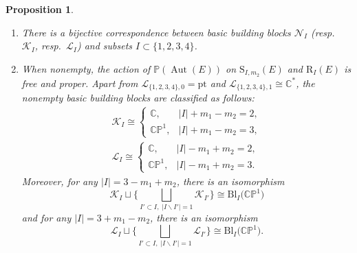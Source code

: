 \documentclass[pdftex]{sigma}
\newcommand{\field}[1]{\ensuremath{\mathbb{#1}}}
\newcommand{\CC}{\field{C}}
\newcommand{\PP}{\field{P}}
\newcommand{\curly}[1]{\mathscr{#1}}
\newcommand{\cK}{\curly{K}}
\newcommand{\cL}{\curly{L}}
\newcommand{\cN}{\curly{N}}
\DeclareMathOperator{\Aut}{Aut}
\numberwithin{equation}{section}
\newtheorem{Proposition}[Theorem]{Proposition}
 { \theoremstyle{definition}
\newtheorem{Definition}[Theorem]{Definition}
\newtheorem{Note}[Theorem]{Note}
\newtheorem{Example}[Theorem]{Example}
\newtheorem{Remark}[Theorem]{Remark} }
\begin{document}
\begin{Proposition}\label{prop:line-orbit}\quad
\begin{enumerate}\itemsep=0pt
\item[$(i)$] There is a bijective correspondence between basic building blocks $\cN_{I}$ (resp.~$\cK_{I}$, resp.~$\cL_{I}$) and subsets $I\subset\{1,2,3,4\}$.
\item[$(ii)$] When nonempty, the action of $\PP(\Aut(E))$ on $\mathrm{S}_{I,m_{2}}(E)$ and $\mathrm{R}_{I}(E)$ is free and proper. Apart from $\cL_{\{1,2,3,4\},0} = \mathrm{pt}$ and $\cL_{\{1,2,3,4\},1}\cong\CC^{*}$, the nonempty basic building blocks are classified as follows:
\begin{gather*}
\cK_{I} \cong\begin{cases}
\CC, & \vert I\vert + m_{1}-m_{2} = 2,
\\
\CC\PP^{1}, & \vert I\vert + m_{1} - m_{2} = 3,
\end{cases}
\\
\cL_{I} \cong\begin{cases}
\CC,& \vert I\vert - m_{1} + m_{2} = 2,
\\
\CC\PP^{1}, & \vert I\vert - m_{1} + m_{2} = 3.
\end{cases}
\end{gather*}
Moreover, for any $\vert I\vert = 3 - m_{1} + m_{2}$, there is an isomorphism
\[
\cK_{I}\sqcup \bigg\{\bigsqcup_{I'\subset I,\; \vert I\backslash I'\vert = 1}\cK_{I'}\bigg\}\cong \mathrm{Bl}_{I}\big(\CC\PP^{1}\big)
\]
and for any $\vert I\vert = 3 + m_{1} - m_{2}$, there is an isomorphism
\[
\cL_{I}\sqcup\bigg\{\bigsqcup_{I'\subset I,\; \vert I\backslash I'\vert = 1}\cL_{I'}\bigg\}\cong \mathrm{Bl}_{I}\big(\CC\PP^{1}\big).
\]
\end{enumerate}
\end{Proposition}
\end{document}
